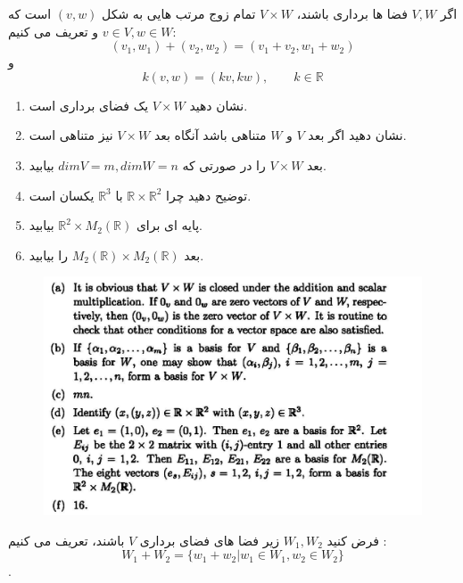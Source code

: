 \documentclass{article}
\begin{document}
اگر 
$V,W$
فضا ها برداری باشند،
$V\times W$
تمام زوج مرتب هایی به شکل 
$(v,w)$
است که 
$v\in V,w\in W$
و تعریف می کنیم:
$$(v_1,w_1)+(v_2,w_2)=(v_1+v_2,w_1+w_2)$$
و 
$$k(v,w)=(kv,kw),\qquad k\in \mathbb{R}$$
\begin{enumerate}
\item 	
	نشان دهید 
	$V\times W$
	یک فضای برداری است.
	\item  
	نشان دهید اگر بعد 
	$V$
	و
	$W$
	متناهی باشد آنگاه بعد 
	$V\times W$
	نیز متناهی است.
	\item 
	بعد 
	$V\times W$
	را در صورتی که 
	$dimV=m,dimW=n$
	بیابید.
	\item 
	توضیح دهید چرا 
	$\mathbb{R}\times \mathbb{R}^2$
	با 
	$\mathbb{R}^3$
	یکسان است.
	\item 
	پایه ای برای 
	$\mathbb{R}^2\times M_2(\mathbb{R})$
	بیابید.
	\item 
	بعد 
	$M_2(\mathbb{R})\times M_2(\mathbb{R})$
	را بیابید.
\end{enumerate}
\begin{حل}
	\begin{figure}[h]
		\centering
		
		‎\includegraphics[scale=0.5]{abc}‎
	\end{figure}    
	\end{حل}
فرض کنید 
$W_1,W_2$
زیر فضا های فضای برداری 
$V$
باشند، تعریف می کنیم :
$$W_1+W_2=\{w_1+w_2|w_1\in W_1,w_2\in W_2\}$$.
\end{document}

